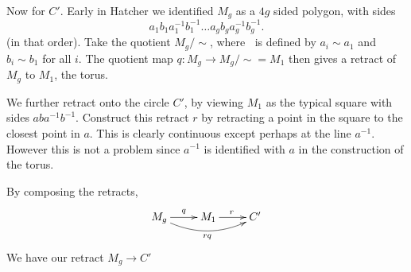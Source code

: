 \documentclass{article}
\begin{document}
Now for $C'$. Early in Hatcher we identified $M_g$ as a $4g$ sided polygon, with sides 
\[
a_1b_1a^{-1}_1b^{-1}_1\dots a_gb_ga_g^{-1}b_g^{-1}
.\] 
(in that order). Take the quotient $M_g / \sim $, where $~$ is defined by $a_i\sim a_1$ and $b_i\sim b_1$ for all $i$. The quotient map  $q:M_g\to M_g /\sim =M_1$ then gives a retract of $M_g$ to $M_1$, the torus.

We further retract onto the circle $C'$, by viewing $M_1$ as the typical square with sides $aba^{-1}b^{-1}.$ Construct this retract $r$ by retracting a point in the square to the closest point in $a$. This is clearly continuous except perhaps at the line $a^{-1}$. However this is not a problem since $a^{-1}$ is identified with $a$ in the construction of the torus.

By composing the retracts,
\[\xymatrix{
        M_g\ar@/_1pc/[rr]_{rq}\ar@{->}[r]^{q}&M_1\ar@{->}[r]^{r}&C'
}\]
We have our retract $M_g\to C'$
\end{document}
